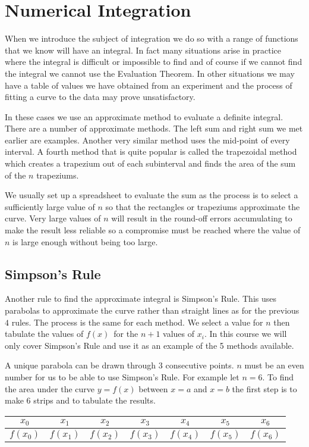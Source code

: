 \section{Numerical Integration}
When we introduce the subject of integration we do so with a range of functions that we know will have an integral. In
fact many situations arise in practice where the integral is difficult or impossible to find and of course if we cannot find the integral we
cannot use the Evaluation Theorem. In other situations we may have a table of values we have obtained from an
experiment and the process of fitting a curve to the data may prove unsatisfactory. 

In these cases we use an approximate method to
evaluate a definite integral. There are a number of approximate methods. The
left sum and right sum we met earlier are examples. Another very similar method uses the mid-point of every
interval. A fourth method that is quite popular is called the trapezoidal method which creates a trapezium out
of each subinterval and finds the area of the sum of the $n$ trapeziums. 

\bigskip We usually set up a spreadsheet to evaluate the sum as
the process is to select a sufficiently large value of $n$ so that the rectangles or trapeziums approximate the curve. Very large values of
$n$ will result in the round-off errors accumulating to make the result less reliable so a compromise must be reached where the
value of $n$ is large enough without being too large. 

\subsection{Simpson's Rule}
Another rule to find the approximate integral is Simpson's Rule. This uses parabolas to approximate the curve rather than straight lines as for
the previous $4$ rules. The process is the same for each method. We
select a value for $n$ then tabulate the values of $f (x)$\ for the $n +1$ values of $x_{i}$. In this course we will only cover Simpson's Rule and use it as an example of the 5 methods
available. 

A unique parabola can be drawn through $3$ consecutive points. $n$ must be an even number for us to be able to use Simpson's Rule. For example let
$n =6$. To find the area under the curve $y =f (x)$ between $x =a$ and $x =b$ the first step is to make 6 strips and to tabulate the results. 

\qquad \qquad \qquad \qquad \qquad
\begin{tabular}[c]{|c|c|c|c|c|c|c|}\hline
$x_{0}$  & $x_{1}$  & $x_{2}$  & $x_{3}$  & $x_{4}$  & $x_{5}$  & $x_{6}$  \\
\hline
$f (x_{0})$  & $f (x_{1})$  & $f (x_{2})$  & $f (x_{3})$  & $f (x_{4})$  & $f (x_{5})$  & $f (x_{6})$  \\
\hline
\end{tabular}

